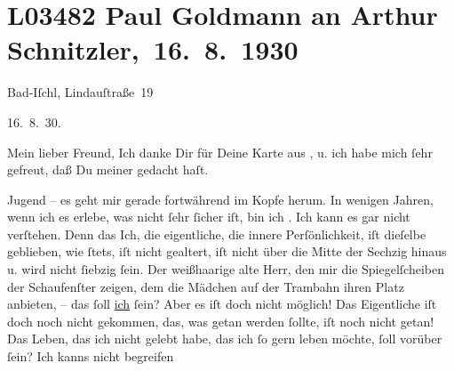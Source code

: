 

\section[ Paul Goldmann an Arthur Schnitzler, 16. 8. 1930]{L03482 Paul Goldmann an Arthur Schnitzler, 16. 8. 1930}
\nopagebreak{}
\rehead{ }\normalsize\beginnumbering{}
\toendnotes[C]{\smallbreak\pagebreak[2]}
\toendnotes[C]{\smallbreak}
\pstart
           {\pb}Bad-Iſchl, Lindauſtraße 19\pend
           
\pstart
           \raggedleft{}16. 8. 30. \pend
           
\pstart{}Mein lieber Freund,\pend\vspace{0.5em}
\pstart
           Ich danke Dir für Deine Karte aus \label{K_L03482-1v}\label{K_L03482-1}, u. ich habe mich ſehr gefreut, daß Du meiner gedacht haſt.\pend
           
\pstart
           Jugend – es geht mir gerade fortwährend im Kopfe herum. In wenigen Jahren,  wenn ich es erlebe, was nicht ſehr ſicher iſt, bin
               ich \label{K_L03482-2v}\label{K_L03482-2}. Ich kann es gar nicht verſtehen. Denn das
               Ich, die eigentliche, die innere Perſönlichkeit, iſt dieſelbe geblieben, wie ſtets,
               iſt nicht gealtert, {\pb}iſt nicht über die Mitte
               der Sechzig hinaus u. wird nicht ſiebzig ſein. Der weißhaarige alte Herr, den mir die
               Spiegelſcheiben der Schaufenſter zeigen, dem die Mädchen auf der Trambahn ihren Platz
               anbieten, – das ſoll \uline{ich} ſein? Aber es iſt doch nicht
               möglich! Das Eigentliche iſt doch noch nicht gekommen, das, was getan werden ſollte,
               iſt noch nicht getan! Das Leben, das ich nicht gelebt habe, das ich ſo gern leben
               möchte, ſoll vorüber ſein? Ich kanns nicht begreifen{\dotsfive}\pend
           
